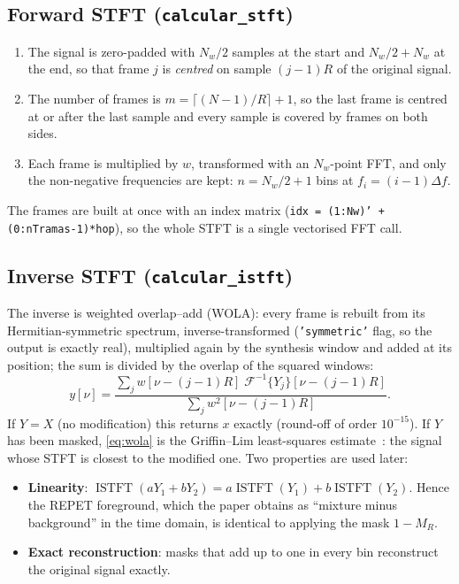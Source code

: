 \documentclass[11pt,a4paper]{article}
\newcommand{\code}[1]{\texttt{#1}}
\DeclareMathOperator{\ISTFT}{ISTFT}
\begin{document}
\subsection{Forward STFT (\code{calcular\_stft})}
\begin{enumerate}[nosep]
  \item The signal is zero-padded with $N_w/2$ samples at the start and
        $N_w/2+N_w$ at the end, so that frame $j$ is \emph{centred} on
        sample $(j-1)R$ of the original signal.
  \item The number of frames is $m=\lceil (N-1)/R\rceil+1$, so the last
        frame is centred at or after the last sample and every sample is
        covered by frames on both sides.
  \item Each frame is multiplied by $w$, transformed with an $N_w$-point
        FFT, and only the non-negative frequencies are kept:
        $n=N_w/2+1$ bins at $f_i=(i-1)\Delta f$.
\end{enumerate}
The frames are built at once with an index matrix
(\code{idx = (1:Nw)' + (0:nTramas-1)*hop}), so the whole STFT is a single
vectorised FFT call.

\subsection{Inverse STFT (\code{calcular\_istft})}
The inverse is weighted overlap--add (WOLA): every frame is rebuilt from
its Hermitian-symmetric spectrum, inverse-transformed (\code{'symmetric'}
flag, so the output is exactly real), multiplied again by the synthesis
window and added at its position; the sum is divided by the overlap of the
squared windows:
\begin{equation}
  y[\nu] = \frac{\sum_j w[\nu-(j-1)R]\;\mathcal{F}^{-1}\{Y_j\}[\nu-(j-1)R]}
                {\sum_j w^2[\nu-(j-1)R]} .
  \label{eq:wola}
\end{equation}
If $Y=X$ (no modification) this returns $x$ exactly (round-off of order
$10^{-15}$). If $Y$ has been masked, \cref{eq:wola} is the Griffin--Lim
least-squares estimate~\cite{griffin1984}: the signal whose STFT is closest
to the modified one. Two properties are used later:
\begin{itemize}[nosep]
  \item \textbf{Linearity}: $\ISTFT(aY_1+bY_2)=a\ISTFT(Y_1)+b\ISTFT(Y_2)$.
        Hence the REPET foreground, which the paper obtains as
        ``mixture minus background'' in the time domain, is identical to
        applying the mask $1-M_R$.
  \item \textbf{Exact reconstruction}: masks that add up to one in every bin
        reconstruct the original signal exactly.
\end{itemize}
\end{document}
